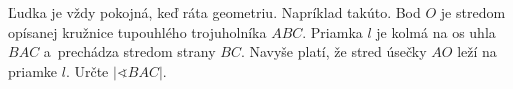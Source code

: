 \createTaskHeader[][9][]
Ľudka je vždy pokojná, keď ráta geometriu. Napríklad takúto. Bod $O$ je stredom opísanej kružnice tupouhlého trojuholníka $ABC$.
Priamka $l$ je kolmá na os uhla $BAC$ a~prechádza stredom strany $BC$. Navyše platí, že stred úsečky $AO$ leží na priamke $l$.
Určte $|\sphericalangle BAC|$.
